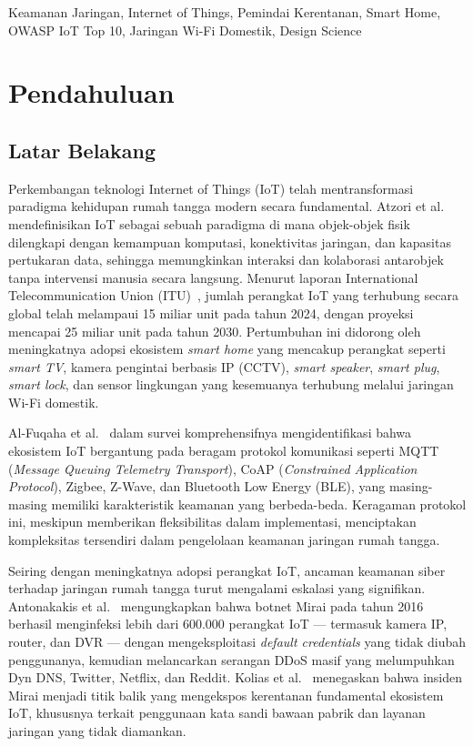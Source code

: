 \documentclass[conference]{IEEEtran}
\begin{document}
\begin{IEEEkeywords}
Keamanan Jaringan, Internet of Things, Pemindai Kerentanan, Smart Home,
OWASP IoT Top 10, Jaringan Wi-Fi Domestik, Design Science
\end{IEEEkeywords}

\section{Pendahuluan}

\subsection{Latar Belakang}

Perkembangan teknologi Internet of Things (IoT) telah mentransformasi
paradigma kehidupan rumah tangga modern secara fundamental.
Atzori et al.\ \cite{atzori2010} mendefinisikan IoT sebagai sebuah paradigma
di mana objek-objek fisik dilengkapi dengan kemampuan komputasi,
konektivitas jaringan, dan kapasitas pertukaran data, sehingga
memungkinkan interaksi dan kolaborasi antarobjek tanpa intervensi
manusia secara langsung. Menurut laporan International
Telecommunication Union (ITU)~\cite{itu2024}, jumlah perangkat IoT
yang terhubung secara global telah melampaui 15 miliar unit pada tahun
2024, dengan proyeksi mencapai 25 miliar unit pada tahun 2030.
Pertumbuhan ini didorong oleh meningkatnya adopsi ekosistem
\textit{smart home} yang mencakup perangkat seperti \textit{smart TV},
kamera pengintai berbasis IP (CCTV), \textit{smart speaker},
\textit{smart plug}, \textit{smart lock}, dan sensor lingkungan yang
kesemuanya terhubung melalui jaringan Wi-Fi domestik.

Al-Fuqaha et al.\ \cite{alfuqaha2015} dalam survei komprehensifnya
mengidentifikasi bahwa ekosistem IoT bergantung pada beragam protokol
komunikasi seperti MQTT (\textit{Message Queuing Telemetry Transport}),
CoAP (\textit{Constrained Application Protocol}), Zigbee, Z-Wave, dan
Bluetooth Low Energy (BLE), yang masing-masing memiliki karakteristik
keamanan yang berbeda-beda. Keragaman protokol ini, meskipun
memberikan fleksibilitas dalam implementasi, menciptakan kompleksitas
tersendiri dalam pengelolaan keamanan jaringan rumah tangga.

Seiring dengan meningkatnya adopsi perangkat IoT, ancaman keamanan
siber terhadap jaringan rumah tangga turut mengalami eskalasi yang
signifikan. Antonakakis et al.\ \cite{antonakakis2017} mengungkapkan
bahwa botnet Mirai pada tahun 2016 berhasil menginfeksi lebih dari
600.000 perangkat IoT --- termasuk kamera IP, router, dan DVR ---
dengan mengeksploitasi \textit{default credentials} yang tidak diubah
penggunanya, kemudian melancarkan serangan DDoS masif yang
melumpuhkan Dyn DNS, Twitter, Netflix, dan Reddit. Kolias
et al.\ \cite{kolias2017} menegaskan bahwa insiden Mirai menjadi titik
balik yang mengekspos kerentanan fundamental ekosistem IoT, khususnya
terkait penggunaan kata sandi bawaan pabrik dan layanan jaringan yang
tidak diamankan.
\end{document}

